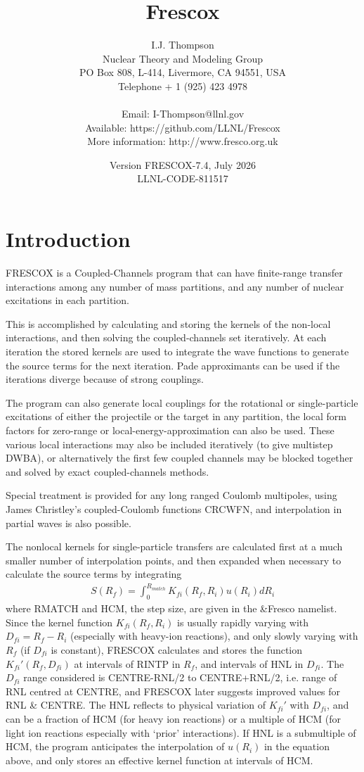 \documentclass[11pt]{article}
\title{\Huge Frescox}
\date{Version FRESCOX-7.4, July 2026\\ LLNL-CODE-811517 }
\author{I.J. Thompson
%
\\Nuclear Theory and Modeling Group
\\PO Box 808, L-414,
 Livermore, CA 94551, USA
\\Telephone + 1 (925) 423 4978
\\ %
\\Email: I-Thompson@llnl.gov
\\Available: https://github.com/LLNL/Frescox
\\More information: http://www.fresco.org.uk }
\newcommand{\beqn}{\begin{eqnarray}}
\newcommand{\eeqn}{\end{eqnarray}}
\begin{document}
\maketitle
\tableofcontents
\newpage
\section{Introduction}

\parskip 5pt
\parindent 10pt

FRESCOX is a Coupled-Channels program that can have finite-range
transfer interactions among any number of mass partitions, and any
number of nuclear excitations in each partition.

This is accomplished by calculating and storing the kernels of the
non-local interactions, and then solving the coupled-channels set
iteratively.
At each iteration the stored kernels are used to integrate the wave
functions to generate the source terms for the next iteration.
Pade approximants can be used if the iterations diverge because of
strong couplings.

The program can also generate local couplings for the rotational
or single-particle excitations of either the projectile or the
target in any partition,
the local form factors for zero-range or local-energy-approximation
can also be used.
These various local interactions may also be included iteratively
(to give multistep DWBA), or alternatively the first few coupled
channels may be blocked together and solved by exact coupled-channels
methods.

Special treatment is provided for any long ranged Coulomb multipoles,
using James Christley's coupled-Coulomb functions CRCWFN,
and interpolation in partial waves is also possible.

The nonlocal kernels for single-particle transfers are calculated first
at a much smaller number of interpolation points,
and then expanded when necessary to calculate the source terms by
integrating
\beqn
S(R _ f ) = \int _ 0 ^ {R _ {match}}
                K _ {fi} (R _ f , R _ i ) u(R _ i ) dR _ i
\eeqn
where RMATCH and HCM, the step size, are given in the \&Fresco namelist.
Since the kernel function $K_{fi}(R_f,R_i)$ is usually rapidly varying with
$D_{fi} = R_{f} - R_{i}$ (especially with heavy-ion reactions), and only slowly
varying with $R_{f}$ (if $D_{fi}$ is constant),  FRESCOX calculates and stores
the function $K_{fi}'(R_{f},D_{fi})$ at intervals of RINTP in $R_{f}$,
and intervals of HNL in $D_{fi}$. The $D_{fi}$ range considered is
CENTRE-RNL/2 to CENTRE+RNL/2, i.e. range of RNL centred at CENTRE,
and FRESCOX later suggests improved values for RNL \& CENTRE.
The HNL reflects to physical variation of $K_{fi}'$ with $D_{fi}$, and can be
a fraction of HCM (for heavy ion reactions) or a multiple of HCM
(for light ion reactions especially with `prior' interactions).
If HNL is a submultiple of HCM, the program anticipates the interpolation
of $u(R_{i})$ in the equation above, and only stores an effective kernel
function at intervals of HCM.
\end{document}
